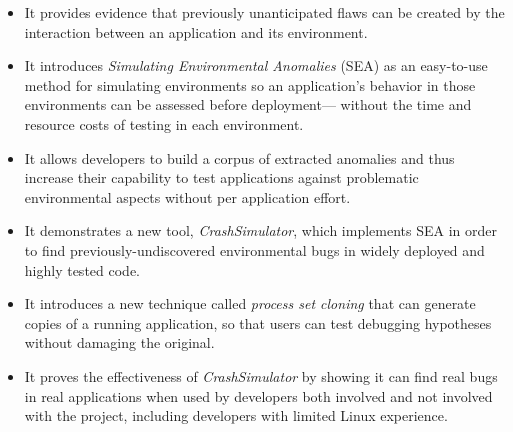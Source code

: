 \begin{itemize}

\item{It provides evidence
that previously unanticipated flaws can be created by the interaction
between an application and its environment.}

\item{It introduces \textit{Simulating Environmental Anomalies} (SEA)
as an easy-to-use method for simulating environments
so an application's behavior in those environments
can be assessed before deployment---
without the time and resource costs of
testing in each environment.}

\item{It allows developers to build a corpus of extracted anomalies and thus 
increase their capability to test applications against
problematic environmental aspects without per application effort.}

\item{It demonstrates a new tool, {\em CrashSimulator},
which implements SEA
in order to find previously-undiscovered environmental bugs
in widely deployed and highly tested code.}

\item{It introduces a new technique called {\it process set cloning}
that can generate copies of a running application,
so that users can test debugging hypotheses without damaging the
original.}

\item{It proves the effectiveness
of {\em CrashSimulator}
by showing it can find real bugs in real applications
when used by developers both involved and not involved with the project,
including developers with limited Linux experience.}

\end{itemize}
